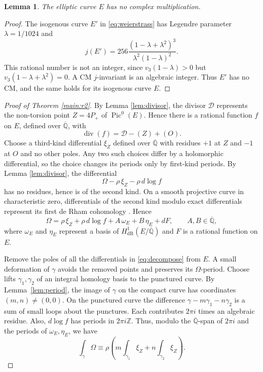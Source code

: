 \documentclass[11pt,a4paper,reqno]{amsart}
\numberwithin{equation}{section}
\theoremstyle{plain}
\newtheorem{lemma}[theorem]{Lemma}
\DeclareMathOperator{\divi}{div}
\DeclareMathOperator{\Pic}{Pic}
\begin{document}
\begin{lemma}\label{lem:nocm}
The elliptic curve $E$ has no complex multiplication.
\end{lemma}
\begin{proof}
The isogenous curve $E'$ in \eqref{eq:weierstrass} has Legendre parameter $\lambda=1/1024$ and
\[
 j(E')=256\frac{(1-\lambda+\lambda^2)^3}{\lambda^2(1-\lambda)^2}.
\]
This rational number is not an integer, since $v_3(1-\lambda)>0$ but
$v_3(1-\lambda+\lambda^2)=0$. A CM $j$-invariant is an algebraic integer. Thus $E'$ has no CM, and the same holds for its isogenous curve $E$.
\end{proof}

\begin{proof}[Proof of Theorem \ref{main:r2}]
By Lemma \ref{lem:divisor}, the divisor $\mathcal D$ represents the non-torsion point $Z=4P_+$ of $\Pic^0(E)$. Hence there is a rational function $f$ on $E$, defined over $\overline{\mathbb Q}$, with
\[
 \divi(f)=\mathcal D-(Z)+(O).
\]
Choose a third-kind differential $\xi_Z$ defined over $\overline{\mathbb Q}$ with residues $+1$ at $Z$ and $-1$ at $O$ and no other poles. Any two such choices differ by a holomorphic differential, so the choice changes its periods only by first-kind periods. By Lemma \ref{lem:divisor}, the differential
\[
 \Omega-\rho\,\xi_Z-\rho\,d\log f
\]
has no residues, hence is of the second kind. On a smooth projective curve in characteristic zero, differentials of the second kind modulo exact differentials represent its first de Rham cohomology \cite{Mukai,HuberWuestholz2022}. Hence
\begin{equation}\label{eq:decompose}
 \Omega=\rho\,\xi_Z+\rho\,d\log f
      +A\,\omega_E+B\,\eta_E+dF,
 \qquad A,B\in\overline{\mathbb Q},
\end{equation}
where $\omega_E$ and $\eta_E$ represent a basis of
$H^1_{\mathrm{dR}}(E/\overline{\mathbb Q})$ and $F$ is a rational function on $E$.

Remove the poles of all the differentials in \eqref{eq:decompose} from $E$. A small deformation of $\gamma$ avoids the removed points and preserves its $\Omega$-period. Choose lifts $\gamma_1,\gamma_2$ of an integral homology basis to the punctured curve. By Lemma~\ref{lem:period}, the image of $\gamma$ on the compact curve has coordinates $(m,n)\ne(0,0)$. On the punctured curve the difference $\gamma-m\gamma_1-n\gamma_2$ is a sum of small loops about the punctures. Each contributes $2\pi i$ times an algebraic residue. Also, $d\log f$ has periods in $2\pi i\mathbb Z$. Thus, modulo the $\overline{\mathbb Q}$-span of $2\pi i$ and the periods of $\omega_E,\eta_E$, we have
\[
 \int_\gamma\Omega\equiv\rho\left(m\int_{\gamma_1}\xi_Z+n\int_{\gamma_2}\xi_Z\right).
\]


\end{proof}
\end{document}
